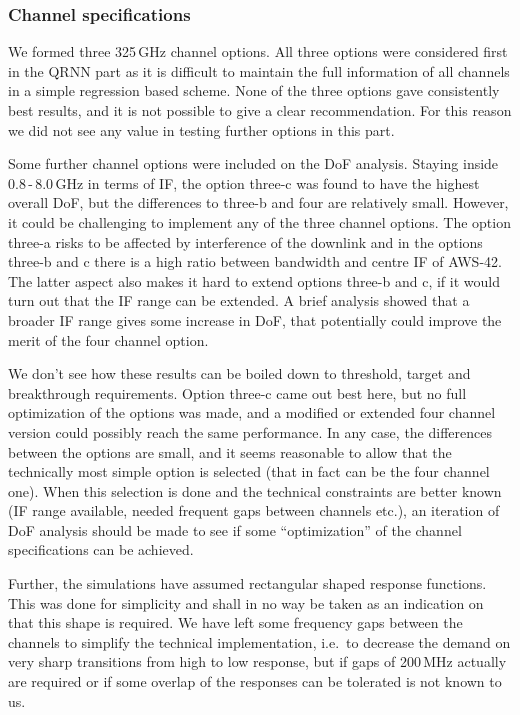 \documentclass[12pt]{article}
\begin{document}
\subsubsection{Channel specifications}
%
We formed three 325\,GHz channel options. All three options were
considered first in the QRNN part as it is difficult to maintain the full
information of all channels in a simple regression based scheme. None of the
three options gave consistently best results, and it is not possible to give a
clear recommendation. For this reason we did not see any value in testing
further options in this part.

Some further channel options were included on the DoF analysis. Staying inside
0.8\,-\,8.0\,GHz in terms of IF, the option three-c was found to have the
highest overall DoF, but the differences to three-b and four are relatively
small. However, it could be challenging to implement any of the three channel
options. The option three-a risks to be affected by interference of the downlink
and in the options three-b and c there is a high ratio between bandwidth and centre IF of AWS-42. The latter aspect also makes it hard to extend options three-b and c, if it would turn out that the IF range can be extended. A brief analysis showed that a broader IF range gives some increase in DoF, that potentially could improve the merit of the four channel option.

We don't see how these results can be boiled down to threshold, target and
breakthrough requirements. Option three-c came out best here, but no full
optimization of the options was made, and a modified or extended four channel
version could possibly reach the same performance. In any case, the differences
between the options are small, and it seems reasonable to allow that the
technically most simple option is selected (that in fact can be the four
channel one). When this selection is done and the technical constraints are
better known (IF range available, needed frequent gaps between channels etc.), an iteration of DoF analysis should be made to see if some ``optimization'' of the channel specifications can be achieved.

Further, the simulations have assumed rectangular shaped response functions.
This was done for simplicity and shall in no way be taken as an indication on
that this shape is required. We have left some frequency gaps between the
channels to simplify the technical implementation, i.e.\ to decrease the demand
on very sharp transitions from high to low response, but if gaps of 200\,MHz
actually are required or if some overlap of the responses can be tolerated is
not known to us.
\end{document}
